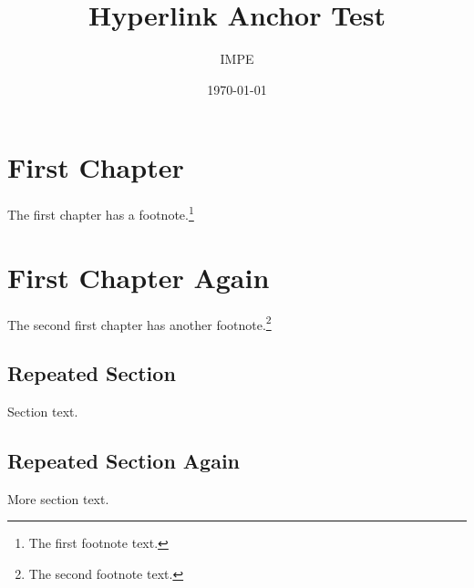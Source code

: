 \documentclass{report}
\title{Hyperlink Anchor Test}
\author{IMPE}
\date{\today}
\begin{document}
\maketitle
\tableofcontents

\chapter{First Chapter}
The first chapter has a footnote.\footnote{The first footnote text.}

\setcounter{chapter}{0}
\chapter{First Chapter Again}
The second first chapter has another footnote.\footnote{The second footnote text.}

\section{Repeated Section}
Section text.

\setcounter{section}{0}
\section{Repeated Section Again}
More section text.
\end{document}
